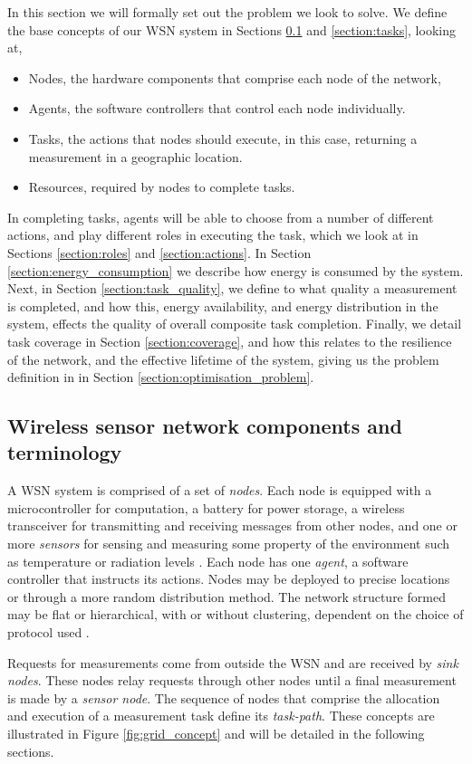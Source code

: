 
In this section we will formally set out the problem we look to solve. We define the base concepts of our WSN system in Sections \ref{section:terminology} and \ref{section:tasks}, looking at,
\begin{itemize}
	\item Nodes, the hardware components that comprise each node of the network,
	\item Agents, the software controllers that control each node individually.
	\item Tasks, the actions that nodes should execute, in this case, returning a measurement in a geographic location.
	\item Resources, required by nodes to complete tasks. 
\end{itemize}
In completing tasks, agents will be able to choose from a number of different actions, and play different roles in executing the task, which we look at in Sections \ref{section:roles} and \ref{section:actions}. In Section \ref{section:energy_consumption} we describe how energy is consumed by the system. Next, in Section \ref{section:task_quality}, we define to what quality a measurement is completed, and how this, energy availability, and energy distribution in the system, effects the quality of overall composite task completion. Finally, we detail task coverage in Section \ref{section:coverage}, and how this relates to the resilience of the network, and the effective lifetime of the system, giving us the problem definition in in Section \ref{section:optimisation_problem}.

\subsection{Wireless sensor network components and terminology}
\label{section:terminology}

A WSN system is comprised of a set of \textit{nodes}. Each node is equipped with a microcontroller for computation, a battery for power storage, a wireless transceiver for  transmitting and receiving messages from other nodes, and one or more \textit{sensors} for sensing and measuring some property of the environment such as temperature or radiation levels \citep{muhammad_r_ahmed_2012_1072589}. Each node has one \textit{agent}, a software controller that instructs its actions. Nodes may be deployed to precise locations or through a more random distribution method. The network structure formed may be flat or hierarchical, with or without clustering, dependent on the choice of protocol used \citep{Carlos-Mancilla2016b}. 

Requests for measurements come from outside the WSN and are received by \textit{sink nodes}. These nodes relay requests through other nodes until a final measurement is made by a \textit{sensor node}. The sequence of nodes that comprise the allocation and execution of a measurement task define its \textit{task-path}. These concepts are illustrated in Figure \ref{fig:grid_concept} and will be detailed in the following sections.